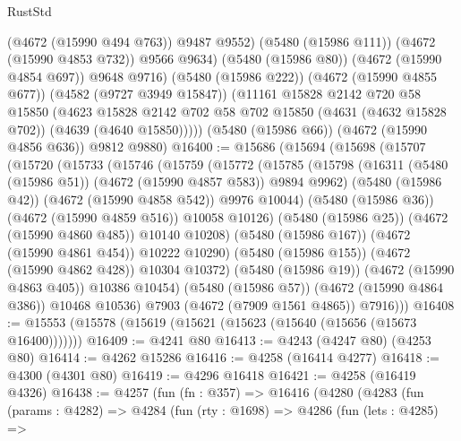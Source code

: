 \begin{lexlean}{RustStd}
\begin{coremodule}
{\begin{coremodule}
{{{{{{{{{{{{{{{{              (@4672 (@15990 @494 @763))
              @9487
              @9552)
            (@5480 (@15986 @111))
            (@4672 (@15990 @4853 @732))
            @9566
            @9634)
          (@5480 (@15986 @80))
          (@4672 (@15990 @4854 @697))
          @9648
          @9716)
        (@5480 (@15986 @222))
        (@4672 (@15990 @4855 @677))
        (@4582 (@9727 @3949 @15847))
        (@11161
          @15828
          @2142
          @720
          @58
          @15850
          (@4623
            @15828
            @2142
            @702
            @58
            @702
            @15850
            (@4631 (@4632 @15828 @702))
            (@4639 (@4640 @15850)))))
      (@5480 (@15986 @66))
      (@4672 (@15990 @4856 @636))
      @9812
      @9880)
@16400 := @15686
    (@15694
      (@15698
        (@15707
          (@15720
            (@15733
              (@15746
                (@15759
                  (@15772
                    (@15785
                      (@15798
                        (@16311 (@5480 (@15986 @51)) (@4672 (@15990 @4857 @583)) @9894 @9962)
                        (@5480 (@15986 @42))
                        (@4672 (@15990 @4858 @542))
                        @9976
                        @10044)
                      (@5480 (@15986 @36))
                      (@4672 (@15990 @4859 @516))
                      @10058
                      @10126)
                    (@5480 (@15986 @25))
                    (@4672 (@15990 @4860 @485))
                    @10140
                    @10208)
                  (@5480 (@15986 @167))
                  (@4672 (@15990 @4861 @454))
                  @10222
                  @10290)
                (@5480 (@15986 @155))
                (@4672 (@15990 @4862 @428))
                @10304
                @10372)
              (@5480 (@15986 @19))
              (@4672 (@15990 @4863 @405))
              @10386
              @10454)
            (@5480 (@15986 @57))
            (@4672 (@15990 @4864 @386))
            @10468
            @10536)
          @7903
          (@4672 (@7909 @1561 @4865))
          @7916)))
@16408 := @15553 (@15578 (@15619 (@15621 (@15623 (@15640 (@15656 (@15673 @16400)))))))
@16409 := @4241 @80
@16413 := @4243 (@4247 @80) (@4253 @80)
@16414 := @4262 @15286
@16416 := @4258 (@16414 @4277)
@16418 := @4300 (@4301 @80)
@16419 := @4296 @16418
@16421 := @4258 (@16419 @4326)
@16438 := @4257
    (fun (fn : @357) =>
    @16416
      (@4280
        (@4283
          (fun (params : @4282) =>
          @4284
            (fun (rty : @1698) =>
            @4286
              (fun (lets : @4285) =>
}}}}}}}}}}}}}}}}
\end{coremodule}}
\end{coremodule}
\end{lexlean}
